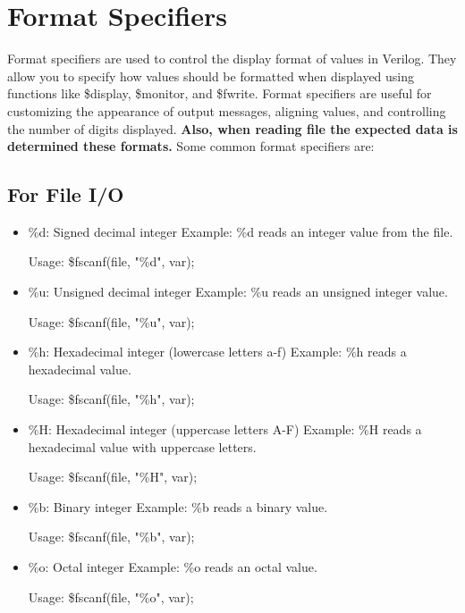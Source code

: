 \documentclass{report}
\begin{document}
\section{Format Specifiers}
Format specifiers are used to control the display format of values in Verilog. They allow you to specify how values should be formatted when displayed using functions like \$display, \$monitor, and \$fwrite. Format specifiers are useful for customizing the appearance of output messages, aligning values, and controlling the number of digits displayed. \textbf{Also, when reading file the expected data is determined these formats.} Some common format specifiers are:
\subsection{For File I/O}

\begin{itemize}
    \item \%d: Signed decimal integer
        Example: \%d reads an integer value from the file.

        Usage: \$fscanf(file, "\%d", var);

    \item \%u: Unsigned decimal integer
        Example: \%u reads an unsigned integer value.

        Usage: \$fscanf(file, "\%u", var);

    \item \%h: Hexadecimal integer (lowercase letters a-f)
        Example: \%h reads a hexadecimal value.

        Usage: \$fscanf(file, "\%h", var);

    \item \%H: Hexadecimal integer (uppercase letters A-F)
        Example: \%H reads a hexadecimal value with uppercase letters.

        Usage: \$fscanf(file, "\%H", var);

    \item \%b: Binary integer
        Example: \%b reads a binary value.

        Usage: \$fscanf(file, "\%b", var);

    \item \%o: Octal integer
        Example: \%o reads an octal value.

        Usage: \$fscanf(file, "\%o", var);
\end{itemize}
\end{document}
